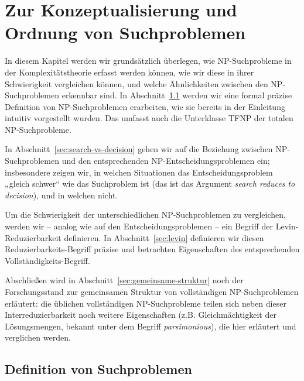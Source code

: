\chapter{Zur Konzeptualisierung und Ordnung von Suchproblemen}\label{chap:searchproblems}

In diesem Kapitel werden wir grundsätzlich überlegen, wie NP-Suchprobleme in der Komplexitätstheorie erfasst werden können, wie wir diese in ihrer Schwierigkeit vergleichen können, und welche Ähnlichkeiten zwischen den NP-Suchproblemen erkennbar sind. 
In Abschnitt~\ref{sec:searchproblems-def} werden wir eine formal präzise Definition von NP-Suchproblemen erarbeiten, wie sie bereits in der Einleitung intuitiv vorgestellt wurden. Das umfasst auch die Unterklasse TFNP der totalen NP-Suchprobleme.

In Abschnitt~\ref{sec:search-vs-decision} gehen wir auf die Beziehung zwischen NP-Suchproblemen und den entsprechenden NP-Entscheidungsproblemen ein; insbesondere zeigen wir, in welchen Situationen das Entscheidungsproblem „gleich schwer“ wie das Suchproblem ist (das ist das Argument \emph{search reduces to decision}), und in welchen nicht.

Um die Schwierigkeit der unterschiedlichen NP-Suchproblemen zu vergleichen, werden wir – analog wie auf den Entscheidungsproblemen – ein Begriff der Levin-Reduzierbarkeit definieren. In Abschnitt~\ref{sec:levin} definieren wir diesen Reduzierbarkeits-Begriff präzise und betrachten Eigenschaften des entsprechenden Vollständigkeits-Begriff.

Abschließen wird in Abschnitt~\ref{sec:gemeinsame-struktur} noch der Forschungsstand zur gemeinsamen Struktur von vollständigen NP-Suchproblemen erläutert: die üblichen vollständigen NP-Suchprobleme teilen sich neben dieser Interreduzierbarkeit noch weitere Eigenschaften (z.B. Gleichmächtigkeit der Lösungsmengen, bekannt unter dem Begriff \emph{parsimonious}), die hier erläutert und verglichen werden. 

\section{Definition von Suchproblemen}\label{sec:searchproblems-def}

